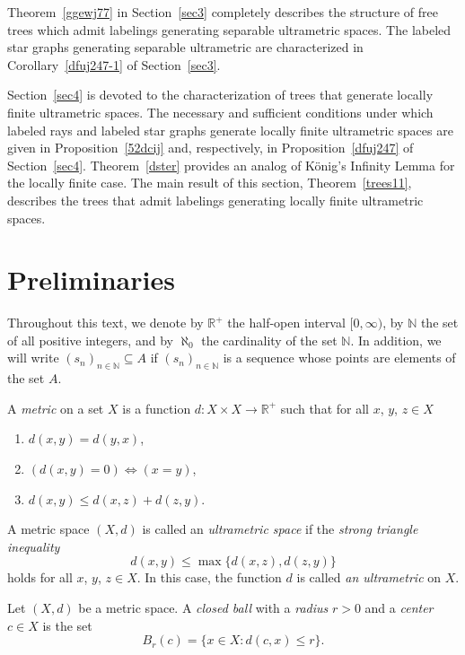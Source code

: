 \documentclass[pdflatex,sn-mathphys-num]{sn-jnl}%
\theoremstyle{thmstyletwo}%
\begin{document}
Theorem~\ref{ggewj77} in Section~\ref{sec3} completely describes the structure of free trees which admit labelings generating separable ultrametric spaces. The labeled star graphs generating separable ultrametric are characterized in Corollary~\ref{dfuj247-1} of Section~\ref{sec3}.

Section~\ref{sec4} is devoted to the characterization of trees that generate locally finite ultrametric spaces. The necessary and sufficient conditions under which labeled rays and labeled star graphs generate locally finite ultrametric spaces are given in Proposition~\ref{52dcij}
and, respectively, in Proposition~\ref{dfuj247} of Section~\ref{sec4}.
Theorem~\ref{dster} provides an analog of K\"onig’s Infinity Lemma for the locally finite case. The main result of this section, Theorem~\ref{trees11}, describes the trees that admit labelings 
generating locally finite ultrametric spaces.




\section{Preliminaries}\label{sec2}


Throughout this text, we denote by \(\mathbb{R}^+\) the half-open interval \([0, \infty)\), by \(\mathbb{N}\) the set of all positive integers, and by $\aleph_0$ the cardinality of the set $\mathbb N$. In addition, we will write $(s_n)_{n \in \mathbb{N}}\subseteq A$ if $(s_n)_{n \in \mathbb{N}}$
is a sequence whose points are elements of the set $A$.


A \textit{metric} on a set $X$ is a function $d\colon X\times X\rightarrow \mathbb R^+$ such that for all \(x\), \(y\), \(z \in X\)
\begin{enumerate}[label=\textit{(\roman*)}, left=0pt]
\item $d(x,y)=d(y,x)$,
\item $(d(x,y)=0)\iff (x=y)$,
\item \(d(x,y)\leq d(x,z) + d(z,y)\).
\end{enumerate}

A metric space \((X, d)\) is called an \emph{ultrametric space} if the \emph{strong triangle inequality}
\[
d(x,y)\leq \max \{d(x,z),d(z,y)\}
\]
holds for all \(x\), \(y\), \(z \in X\). In this case, the function \(d\) is called \emph{an ultrametric} on \(X\).






Let \((X, d)\) be a metric space. A \emph{closed ball} with a \emph{radius} \(r > 0\) and a \emph{center} \(c \in X\) is the set
\[
B_r(c) = \{x \in X \colon d(c, x) \leq r\}.
\]
\end{document}

